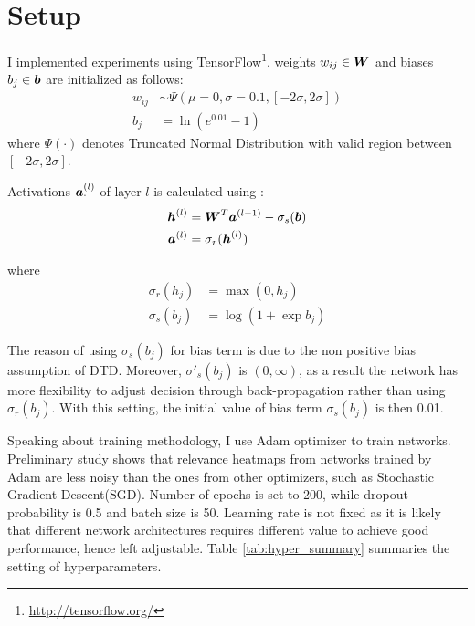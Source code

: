 \section{Setup}\label{sec:setup}
 
 I implemented experiments using TensorFlow\footnote{\url{http://tensorflow.org/}}.  weights $w_{ij} \in \patmatrix{W}$ and biases $b_{j} \in \patvector{b}$ are initialized as follows:
\begin{align*}
	w_{ij} &\sim \Psi( \mu=0, \sigma =0.1, [-2\sigma, 2\sigma]) \\
	b_{j} &= \ln(e^{0.01} - 1)
\end{align*}
where $\Psi(\cdot)$ denotes Truncated Normal Distribution with valid region between $[-2\sigma, 2\sigma]$.


Activations $\patvector{a}^{(l)}_\cdot$ of layer $l$ is calculated using :
\begin{align*}
	\patvector{h}^{(l)}  &=  	\patmatrix{W}^T \patvector{a}^{(l-1)} - \sigma_{s}(\patvector{b}) \\
	\patvector{a}^{(l)}  &=  	\sigma_{r} (	\patvector{h}^{(l)} )
\end{align*}

where
\begin{align*}
	\sigma_{r} (h_j) &= \max(0, h_j)  \tag{ReLU function}\\
	\sigma_{s} (b_j) &= \log(1+\exp b_j) \tag{Softplus function}
\end{align*}

The reason of using $\sigma_{s} (b_j)$ for bias term is due to the non positive bias assumption of DTD. Moreover, $\sigma'_{s} (b_j)$ is $(0, \infty)$, as a result the network has more flexibility to adjust decision through back-propagation rather than using $\sigma_{r} (b_j)$. With this setting, the initial value of bias term  $\sigma_{s}(b_j)$ is then 0.01.

Speaking about training methodology, I use Adam\cite{KingmaAdamMethodStochastic2014} optimizer to train networks. Preliminary study shows that relevance heatmaps from networks trained by Adam are less noisy than the ones from other optimizers, such as  Stochastic Gradient Descent(SGD). Number of epochs is set to 200, while dropout probability is 0.5 and batch size is 50.  
Learning rate is not fixed as it is likely that different network architectures requires different value to achieve good performance, hence left adjustable. Table \ref{tab:hyper_summary} summaries the setting of hyperparameters.

